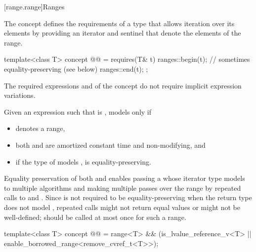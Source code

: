 [range.range]{Ranges}

\pnum
The  concept defines the requirements of a type that allows
iteration over its elements by providing an iterator and sentinel
that denote the elements of the range.

\begin{itemdecl}
template<class T>
  concept @@ =
    requires(T& t) {
      ranges::begin(t);                         // sometimes equality-preserving (see below)
      ranges::end(t);
    };
\end{itemdecl}

\begin{itemdescr}
\pnum
The required expressions
and
of the  concept
do not require implicit expression variations.

\pnum
Given an expression  such that  is ,
 models  only if
\begin{itemize}
\item {}
  denotes a range,

\item both
and
are amortized constant time and non-modifying, and

\item if the type of  models
,  is equality-preserving.
\end{itemize}

\pnum
\begin{note}
Equality preservation of both  and
 enables passing a  whose iterator
type models  to multiple
algorithms and making multiple passes over the range by repeated calls to
 and .
Since  is not required to be equality-preserving
when the return type does not model , repeated calls
might not return equal values or might not be well-defined;
 should be called at most once for such a range.
\end{note}
\end{itemdescr}

\begin{itemdecl}
template<class T>
  concept @@ =
    range<T> &&
      (is_lvalue_reference_v<T> || enable_borrowed_range<remove_cvref_t<T>>);
\end{itemdecl}

